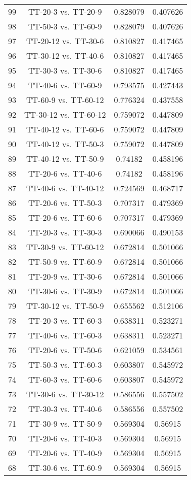 \documentclass[a4paper,10pt]{article}
\begin{document}
\begin{landscape}
\begin{table}[!htp]
\begin{tabular}{cccc}
99&TT-20-3 vs. TT-20-9&0.828079&0.407626\\
98&TT-50-3 vs. TT-60-9&0.828079&0.407626\\
97&TT-20-12 vs. TT-30-6&0.810827&0.417465\\
96&TT-30-12 vs. TT-40-6&0.810827&0.417465\\
95&TT-30-3 vs. TT-30-6&0.810827&0.417465\\
94&TT-40-6 vs. TT-60-9&0.793575&0.427443\\
93&TT-60-9 vs. TT-60-12&0.776324&0.437558\\
92&TT-30-12 vs. TT-60-12&0.759072&0.447809\\
91&TT-40-12 vs. TT-60-6&0.759072&0.447809\\
90&TT-40-12 vs. TT-50-3&0.759072&0.447809\\
89&TT-40-12 vs. TT-50-9&0.74182&0.458196\\
88&TT-20-6 vs. TT-40-6&0.74182&0.458196\\
87&TT-40-6 vs. TT-40-12&0.724569&0.468717\\
86&TT-20-6 vs. TT-50-3&0.707317&0.479369\\
85&TT-20-6 vs. TT-60-6&0.707317&0.479369\\
84&TT-20-3 vs. TT-30-3&0.690066&0.490153\\
83&TT-30-9 vs. TT-60-12&0.672814&0.501066\\
82&TT-50-9 vs. TT-60-9&0.672814&0.501066\\
81&TT-20-9 vs. TT-30-6&0.672814&0.501066\\
80&TT-30-6 vs. TT-30-9&0.672814&0.501066\\
79&TT-30-12 vs. TT-50-9&0.655562&0.512106\\
78&TT-20-3 vs. TT-60-3&0.638311&0.523271\\
77&TT-40-6 vs. TT-60-3&0.638311&0.523271\\
76&TT-20-6 vs. TT-50-6&0.621059&0.534561\\
75&TT-50-3 vs. TT-60-3&0.603807&0.545972\\
74&TT-60-3 vs. TT-60-6&0.603807&0.545972\\
73&TT-30-6 vs. TT-30-12&0.586556&0.557502\\
72&TT-30-3 vs. TT-40-6&0.586556&0.557502\\
71&TT-30-9 vs. TT-50-9&0.569304&0.56915\\
70&TT-20-6 vs. TT-40-3&0.569304&0.56915\\
69&TT-20-6 vs. TT-40-9&0.569304&0.56915\\
68&TT-30-6 vs. TT-60-9&0.569304&0.56915\\

\end{tabular}
\end{table}
\end{landscape}
\end{document}
